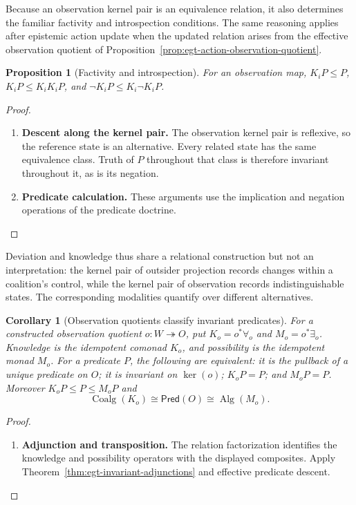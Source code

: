\documentclass[11pt,a4paper]{article}
\numberwithin{equation}{section}
\newtheorem{proposition}[theorem]{Proposition}
\newtheorem{corollary}[theorem]{Corollary}
\theoremstyle{definition}
\theoremstyle{remark}
\theoremstyle{plain}
\begin{document}
Because an observation kernel pair is an equivalence relation, it
also determines the familiar factivity and introspection conditions.
The same reasoning applies after epistemic action update when the
updated relation arises from the effective observation quotient of
Proposition~\ref{prop:egt-action-observation-quotient}.

\begin{proposition}[Factivity and introspection]
For an observation map, $K_iP\leq P$, $K_iP\leq K_iK_iP$, and
$\neg K_iP\leq K_i\neg K_iP$.
\end{proposition}
\begin{proof}
\leavevmode
\begin{enumerate}[label=\textup{(\arabic*)},leftmargin=*,itemsep=4pt,topsep=3pt]
  \item \textbf{Descent along the kernel pair.} The observation kernel pair is reflexive, so the reference state is an
alternative. Every related state has the same equivalence class. Truth of
$P$ throughout that class is therefore invariant throughout it, as is its
negation.
  \item \textbf{Predicate calculation.} These arguments use the implication and negation operations of the predicate doctrine.
\end{enumerate}
\end{proof}

Deviation and knowledge thus share a relational construction but not
an interpretation: the kernel pair of outsider projection records changes
within a coalition's control, while the kernel pair of observation records
indistinguishable states. The corresponding modalities quantify over
different alternatives.

\begin{corollary}[Observation quotients classify invariant predicates]
\label{prop:egt-observation-interior}
For a constructed observation quotient $o:W\twoheadrightarrow O$, put
$K_o=o^*\forall_o$ and $M_o=o^*\exists_o$. Knowledge is the
idempotent comonad $K_o$, and possibility is the idempotent monad $M_o$.
For a predicate $P$, the following are equivalent: it is the pullback
of a unique predicate on $O$; it is invariant on $\ker(o)$;
$K_oP=P$; and $M_oP=P$. Moreover $K_oP\leq P\leq M_oP$ and
\[
 \operatorname{Coalg}(K_o)\cong\mathsf{Pred}(O)
 \cong\operatorname{Alg}(M_o).
\]
\end{corollary}
\begin{proof}
\leavevmode
\begin{enumerate}[label=\textup{(\arabic*)},leftmargin=*,itemsep=4pt,topsep=3pt]
  \item \textbf{Adjunction and transposition.} The relation factorization identifies the knowledge and possibility
operators with the displayed composites. Apply
Theorem~\ref{thm:egt-invariant-adjunctions} and effective predicate descent.
\end{enumerate}
\end{proof}
\end{document}

